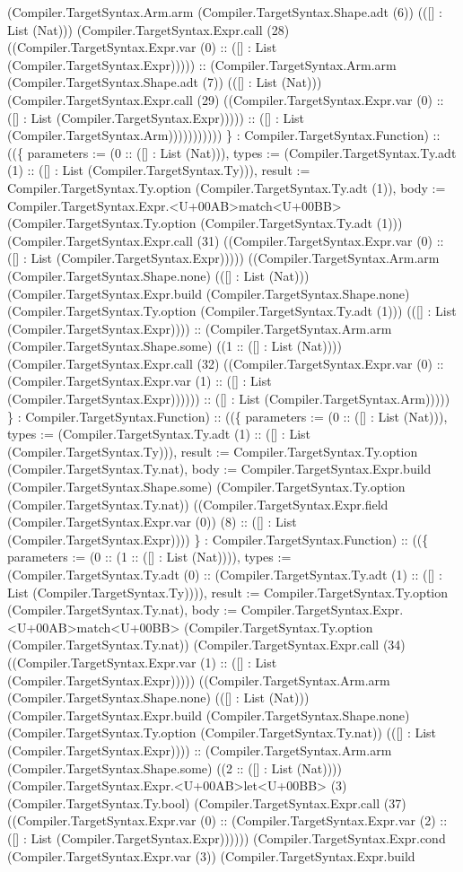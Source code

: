 \documentclass[11pt]{article}
\begin{document}
(Compiler.TargetSyntax.Arm.arm (Compiler.TargetSyntax.Shape.adt (6)) (([] : List (Nat))) (Compiler.TargetSyntax.Expr.call (28) ((Compiler.TargetSyntax.Expr.var (0) :: ([] : List (Compiler.TargetSyntax.Expr))))) :: (Compiler.TargetSyntax.Arm.arm (Compiler.TargetSyntax.Shape.adt (7)) (([] : List (Nat))) (Compiler.TargetSyntax.Expr.call (29) ((Compiler.TargetSyntax.Expr.var (0) :: ([] : List (Compiler.TargetSyntax.Expr))))) :: ([] : List (Compiler.TargetSyntax.Arm))))))))))) \} : Compiler.TargetSyntax.Function) :: ((\{ parameters := (0 :: ([] : List (Nat))), types := (Compiler.TargetSyntax.Ty.adt (1) :: ([] : List (Compiler.TargetSyntax.Ty))), result := Compiler.TargetSyntax.Ty.option (Compiler.TargetSyntax.Ty.adt (1)), body := Compiler.TargetSyntax.Expr.<U+00AB>match<U+00BB> (Compiler.TargetSyntax.Ty.option (Compiler.TargetSyntax.Ty.adt (1))) (Compiler.TargetSyntax.Expr.call (31) ((Compiler.TargetSyntax.Expr.var (0) :: ([] : List (Compiler.TargetSyntax.Expr))))) ((Compiler.TargetSyntax.Arm.arm (Compiler.TargetSyntax.Shape.none) (([] : List (Nat))) (Compiler.TargetSyntax.Expr.build (Compiler.TargetSyntax.Shape.none) (Compiler.TargetSyntax.Ty.option (Compiler.TargetSyntax.Ty.adt (1))) (([] : List (Compiler.TargetSyntax.Expr)))) :: (Compiler.TargetSyntax.Arm.arm (Compiler.TargetSyntax.Shape.some) ((1 :: ([] : List (Nat)))) (Compiler.TargetSyntax.Expr.call (32) ((Compiler.TargetSyntax.Expr.var (0) :: (Compiler.TargetSyntax.Expr.var (1) :: ([] : List (Compiler.TargetSyntax.Expr)))))) :: ([] : List (Compiler.TargetSyntax.Arm))))) \} : Compiler.TargetSyntax.Function) :: ((\{ parameters := (0 :: ([] : List (Nat))), types := (Compiler.TargetSyntax.Ty.adt (1) :: ([] : List (Compiler.TargetSyntax.Ty))), result := Compiler.TargetSyntax.Ty.option (Compiler.TargetSyntax.Ty.nat), body := Compiler.TargetSyntax.Expr.build (Compiler.TargetSyntax.Shape.some) (Compiler.TargetSyntax.Ty.option (Compiler.TargetSyntax.Ty.nat)) ((Compiler.TargetSyntax.Expr.field (Compiler.TargetSyntax.Expr.var (0)) (8) :: ([] : List (Compiler.TargetSyntax.Expr)))) \} : Compiler.TargetSyntax.Function) :: ((\{ parameters := (0 :: (1 :: ([] : List (Nat)))), types := (Compiler.TargetSyntax.Ty.adt (0) :: (Compiler.TargetSyntax.Ty.adt (1) :: ([] : List (Compiler.TargetSyntax.Ty)))), result := Compiler.TargetSyntax.Ty.option (Compiler.TargetSyntax.Ty.nat), body := Compiler.TargetSyntax.Expr.<U+00AB>match<U+00BB> (Compiler.TargetSyntax.Ty.option (Compiler.TargetSyntax.Ty.nat)) (Compiler.TargetSyntax.Expr.call (34) ((Compiler.TargetSyntax.Expr.var (1) :: ([] : List (Compiler.TargetSyntax.Expr))))) ((Compiler.TargetSyntax.Arm.arm (Compiler.TargetSyntax.Shape.none) (([] : List (Nat))) (Compiler.TargetSyntax.Expr.build (Compiler.TargetSyntax.Shape.none) (Compiler.TargetSyntax.Ty.option (Compiler.TargetSyntax.Ty.nat)) (([] : List (Compiler.TargetSyntax.Expr)))) :: (Compiler.TargetSyntax.Arm.arm (Compiler.TargetSyntax.Shape.some) ((2 :: ([] : List (Nat)))) (Compiler.TargetSyntax.Expr.<U+00AB>let<U+00BB> (3) (Compiler.TargetSyntax.Ty.bool) (Compiler.TargetSyntax.Expr.call (37) ((Compiler.TargetSyntax.Expr.var (0) :: (Compiler.TargetSyntax.Expr.var (2) :: ([] : List (Compiler.TargetSyntax.Expr)))))) (Compiler.TargetSyntax.Expr.cond (Compiler.TargetSyntax.Expr.var (3)) (Compiler.TargetSyntax.Expr.build 
\end{document}
